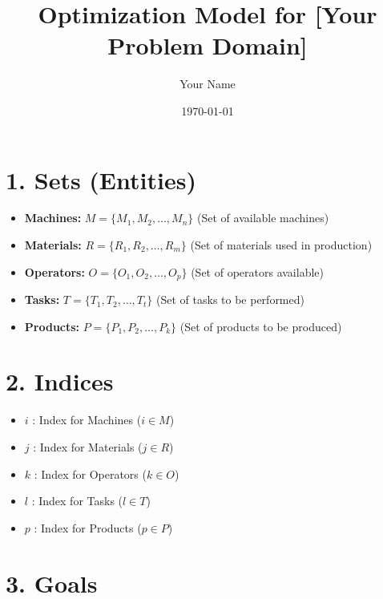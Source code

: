 \documentclass{article}
\title{Optimization Model for [Your Problem Domain]}
\author{Your Name}
\date{\today}
\begin{document}
\maketitle

\tableofcontents
\newpage

\section{1. Sets (Entities)}

\begin{itemize}
    \item \textbf{Machines:} $M = \{M_1, M_2, \dots, M_n\}$ (Set of available machines)
    \item \textbf{Materials:} $R = \{R_1, R_2, \dots, R_m\}$ (Set of materials used in production)
    \item \textbf{Operators:} $O = \{O_1, O_2, \dots, O_p\}$ (Set of operators available)
    \item \textbf{Tasks:} $T = \{T_1, T_2, \dots, T_t\}$ (Set of tasks to be performed)
    \item \textbf{Products:} $P = \{P_1, P_2, \dots, P_k\}$ (Set of products to be produced)
\end{itemize}

\section{2. Indices}

\begin{itemize}
    \item $i$ : Index for Machines ($i \in M$)
    \item $j$ : Index for Materials ($j \in R$)
    \item $k$ : Index for Operators ($k \in O$)
    \item $l$ : Index for Tasks ($l \in T$)
    \item $p$ : Index for Products ($p \in P$)
\end{itemize}

\section{3. Goals}
\end{document}
